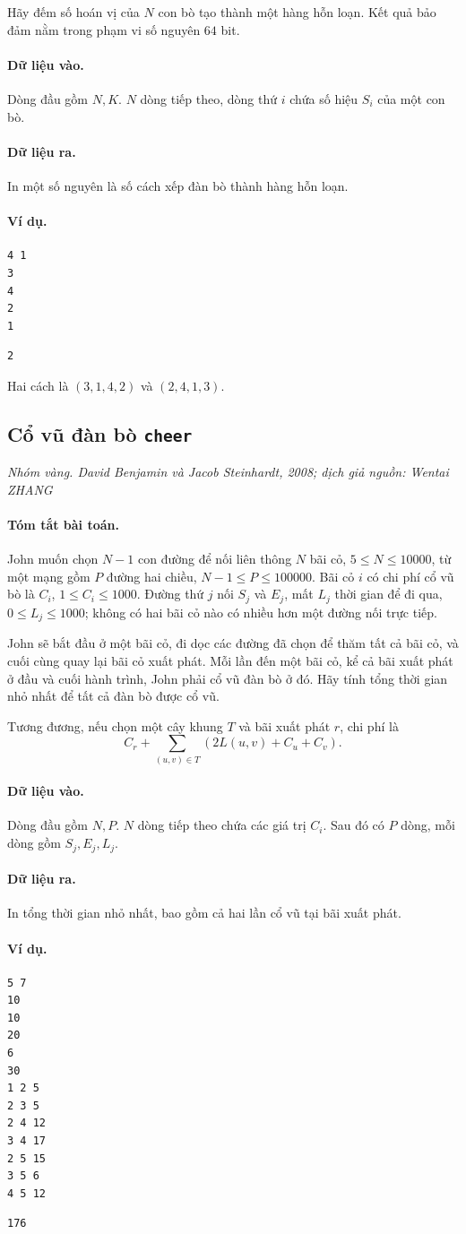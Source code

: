 \documentclass[11pt]{article}
\newcommand{\problem}[4]{%
  \subsection[#1 (#2)]{#1 \hfill {\normalsize\texttt{#2}}}%
  \noindent\textit{#3. #4}\par\smallskip
}
\newcommand{\iosec}[1]{\paragraph{#1}}
\begin{document}
Hãy đếm số hoán vị của \(N\) con bò tạo thành một hàng hỗn loạn. Kết quả bảo
đảm nằm trong phạm vi số nguyên \(64\) bit.

\iosec{Dữ liệu vào.}
Dòng đầu gồm \(N,K\). \(N\) dòng tiếp theo, dòng thứ \(i\) chứa số hiệu
\(S_i\) của một con bò.

\iosec{Dữ liệu ra.}
In một số nguyên là số cách xếp đàn bò thành hàng hỗn loạn.

\iosec{Ví dụ.}
\begin{verbatim}
4 1
3
4
2
1
\end{verbatim}

\begin{verbatim}
2
\end{verbatim}

Hai cách là \((3,1,4,2)\) và \((2,4,1,3)\).

\problem{Cổ vũ đàn bò}{cheer}{Nhóm vàng}{David Benjamin và Jacob Steinhardt, 2008; dịch giả nguồn: Wentai ZHANG}

\iosec{Tóm tắt bài toán.}
John muốn chọn \(N-1\) con đường để nối liên thông \(N\) bãi cỏ,
\(5\le N\le 10000\), từ một mạng gồm \(P\) đường hai chiều,
\(N-1\le P\le 100000\). Bãi cỏ \(i\) có chi phí cổ vũ bò là \(C_i\),
\(1\le C_i\le 1000\). Đường thứ \(j\) nối \(S_j\) và \(E_j\), mất
\(L_j\) thời gian để đi qua, \(0\le L_j\le 1000\); không có hai bãi cỏ nào
có nhiều hơn một đường nối trực tiếp.

John sẽ bắt đầu ở một bãi cỏ, đi dọc các đường đã chọn để thăm tất cả bãi cỏ,
và cuối cùng quay lại bãi cỏ xuất phát. Mỗi lần đến một bãi cỏ, kể cả bãi
xuất phát ở đầu và cuối hành trình, John phải cổ vũ đàn bò ở đó. Hãy tính
tổng thời gian nhỏ nhất để tất cả đàn bò được cổ vũ.

Tương đương, nếu chọn một cây khung \(T\) và bãi xuất phát \(r\), chi phí là
\[
  C_r+\sum_{(u,v)\in T}(2L(u,v)+C_u+C_v).
\]

\iosec{Dữ liệu vào.}
Dòng đầu gồm \(N,P\). \(N\) dòng tiếp theo chứa các giá trị \(C_i\). Sau đó
có \(P\) dòng, mỗi dòng gồm \(S_j,E_j,L_j\).

\iosec{Dữ liệu ra.}
In tổng thời gian nhỏ nhất, bao gồm cả hai lần cổ vũ tại bãi xuất phát.

\iosec{Ví dụ.}
\begin{verbatim}
5 7
10
10
20
6
30
1 2 5
2 3 5
2 4 12
3 4 17
2 5 15
3 5 6
4 5 12
\end{verbatim}

\begin{verbatim}
176
\end{verbatim}
\end{document}
